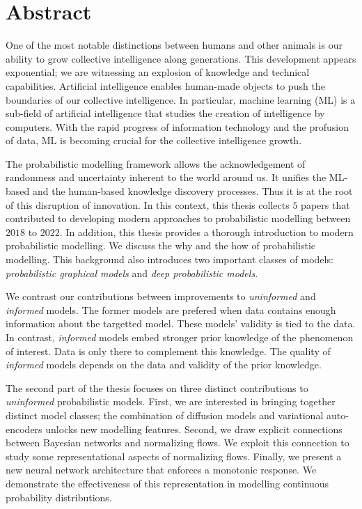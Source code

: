 
\chapter*{Abstract}
One of the most notable distinctions between humans and other animals is our ability to grow collective intelligence along generations. This development appears exponential; we are witnessing an explosion of knowledge and technical capabilities. Artificial intelligence enables human-made objects to push the boundaries of our collective intelligence. In particular, machine learning (ML) is a sub-field of artificial intelligence that studies the creation of intelligence by computers. With the rapid progress of information technology and the profusion of data, ML is becoming crucial for the collective intelligence growth.

The probabilistic modelling framework allows the acknowledgement of randomness and uncertainty inherent to the world around us. It unifies the ML-based and the human-based knowledge discovery processes.
Thus it is at the root of this disruption of innovation.
In this context, this thesis collects $5$ papers that contributed to developing modern approaches to probabilistic modelling between $2018$ to $2022$.
In addition, this thesis provides a thorough introduction to modern probabilistic modelling. We discuss the why and the how of probabilistic modelling. This background also introduces two important classes of models: \textit{probabilistic graphical models} and \textit{deep probabilistic models}.

We contrast our contributions between improvements to \textit{uninformed} and \textit{informed} models. The former models are prefered when data contains enough information about the targetted model. These models' validity is tied to the data. In contrast, \textit{informed} models embed stronger prior knowledge of the phenomenon of interest. Data is only there to complement this knowledge. The quality of \textit{informed} models depends on the data and validity of the prior knowledge.

The second part of the thesis focuses on three distinct contributions to \textit{uninformed} probabilistic models. First, we are interested in bringing together distinct model classes; the combination of diffusion models and variational auto-encoders unlocks new modelling features. Second, we draw explicit connections between Bayesian networks and normalizing flows. We exploit this connection to study some representational aspects of normalizing flows. Finally, we present a new neural network architecture that enforces a monotonic response. We demonstrate the effectiveness of this representation in modelling continuous probability distributions.

